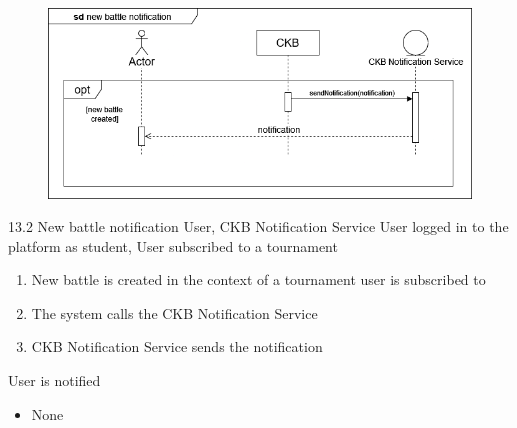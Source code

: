 \usecase
{
    \begin{figure}[H]
        \centering
        \includegraphics[width=\textwidth]{src/sequence_diagrams/notifybattle.png}
    \end{figure}
}
{13.2}
{New battle notification} %
{User, CKB Notification Service} %
{User logged in to the platform as student, User subscribed to a tournament} %
{ %
    \begin{enumerate}
        \item New battle is created in the context of a tournament user is subscribed to
        \item The system calls the CKB Notification Service
        \item CKB Notification Service sends the notification
    \end{enumerate}
}
{User is notified} %
{ %
    \begin{itemize}
        \item None
    \end{itemize}
}
{ %

}

